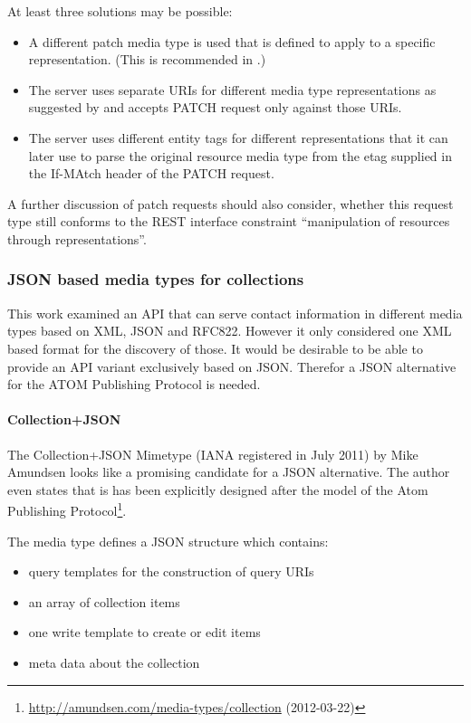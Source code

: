 \documentclass[11pt,a4paper,headsepline,twoside]{scrartcl}		%
\newcommand{\citeurl}[2]{\url{#1} (#2)}
\begin{document}
At least three solutions may be possible:
\begin{itemize}
\item A different patch media type is used that is defined to apply to a specific
  representation. (This is recommended in \cite[ch. 11.9]{Allamaraju_2010}.)
\item The server uses separate URIs for different media type representations as
  suggested by \cite{Raman2006} and accepts PATCH request only against those
  URIs.
\item The server uses different entity tags for different representations that
  it can later use to parse the original resource media type from the etag
  supplied in the If-MAtch header of the PATCH request.
\end{itemize}

A further discussion of patch requests should also consider, whether this
request type still conforms to the REST interface constraint ``manipulation of
resources through representations''\cite[sec. 5.1.5]{Fielding2000}.

\subsubsection{JSON based media types for collections}
\label{sec:media-types-coll}

This work examined an API that can serve contact information in different
media types based on XML, JSON and RFC822. However it only considered one XML
based format for the discovery of those. It would be desirable to be able to
provide an API variant exclusively based on JSON. Therefor a JSON alternative
for the ATOM Publishing Protocol is needed.

\paragraph{Collection+JSON}
\label{sec:collection+json}

The Collection+JSON Mimetype (IANA registered in July 2011) by Mike
Amundsen \cite{Amundsen2011a}\cite[ch. 3]{amundsen2011building} looks like a
promising candidate for a JSON alternative. The author even states that is has
been explicitly designed after the model of the Atom Publishing
Protocol\footnote{\citeurl{http://amundsen.com/media-types/collection}{2012-03-22}}.

The media type defines a JSON structure which contains:

\begin{itemize}
\item query templates for the construction of query URIs
\item an array of collection items
\item one write template to create or edit items
\item meta data about the collection
\end{itemize}
\end{document}
